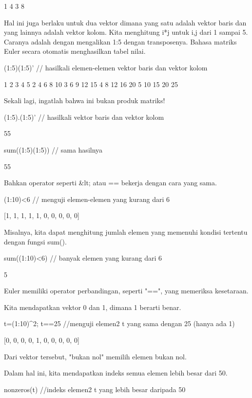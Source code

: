 \documentclass{article}
\begin{document}
                1             4 
                3             8 

Hal ini juga berlaku untuk dua vektor dimana yang satu adalah vektor
baris dan yang lainnya adalah vektor kolom. Kita menghitung i*j untuk
i,j dari 1 sampai 5. Caranya adalah dengan mengalikan 1:5 dengan
transposenya. Bahasa matriks Euler secara otomatis menghasilkan tabel
nilai.


\>(1:5)\*(1:5)' // hasilkali elemen-elemen vektor baris dan vektor kolom


                1             2             3             4             5 
                2             4             6             8            10 
                3             6             9            12            15 
                4             8            12            16            20 
                5            10            15            20            25 

Sekali lagi, ingatlah bahwa ini bukan produk matriks!


\>(1:5).(1:5)' // hasilkali vektor baris dan vektor kolom


    55

\>sum((1:5)\*(1:5)) // sama hasilnya


    55

Bahkan operator seperti &lt; atau == bekerja dengan cara yang sama.


\>(1:10)<6 // menguji elemen-elemen yang kurang dari 6


    [1,  1,  1,  1,  1,  0,  0,  0,  0,  0]

Misalnya, kita dapat menghitung jumlah elemen yang memenuhi kondisi
tertentu dengan fungsi sum().


\>sum((1:10)<6) // banyak elemen yang kurang dari 6


    5

Euler memiliki operator perbandingan, seperti "==", yang memeriksa
kesetaraan.


Kita mendapatkan vektor 0 dan 1, dimana 1 berarti benar.


\>t=(1:10)^2; t==25 //menguji elemen2 t yang sama dengan 25 (hanya ada 1)


    [0,  0,  0,  0,  1,  0,  0,  0,  0,  0]

Dari vektor tersebut, "bukan nol" memilih elemen bukan nol.


Dalam hal ini, kita mendapatkan indeks semua elemen lebih besar dari
50.


\>nonzeros(t) //indeks elemen2 t yang lebih besar daripada 50
\end{document}
